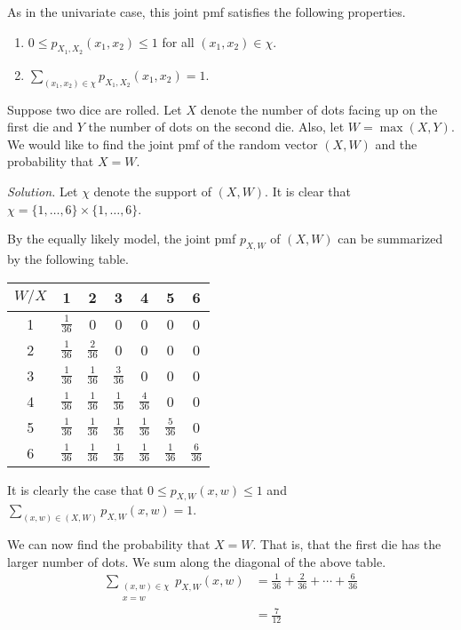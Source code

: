 As in the univariate case, this joint pmf satisfies the following properties.
\begin{enumerate}
	\item $0\leq p_{X_1,X_2}(x_1,x_2)\leq 1$ for all $(x_1,x_2)\in\chi$.
	\item $\sum_{(x_1,x_2)\in\chi}p_{X_1,X_2}(x_1,x_2)=1$.
\end{enumerate}

\begin{example}[]
	Suppose two dice are rolled. Let $X$ denote the number of dots facing up on the first die and $Y$ the number of dots on the second die. Also, let $W=\max(X,Y)$. We would like to find the joint pmf of the random vector $(X,W)$ and the probability that $X=W$.

	\textit{Solution.} Let $\chi$ denote the support of $(X,W)$. It is clear that $\chi=\{1,\hdots,6\}\times\{1,\hdots,6\}$.

	By the equally likely model, the joint pmf $p_{X,W}$ of $(X,W)$ can be summarized by the following table.

	\begin{center}
	\begin{tabular}{c | c c c c c c}
		$W/X$ & 1 & 2 & 3 & 4 & 5 & 6\\\hline
		1 & $\frac{1}{36}$ & 0 & 0 & 0 & 0 & 0\\
		2 & $\frac{1}{36}$ & $\frac{2}{36}$ & 0 & 0 & 0 & 0\\
		3 & $\frac{1}{36}$ & $\frac{1}{36}$ & $\frac{3}{36}$ & 0 & 0 & 0\\
		4 & $\frac{1}{36}$ & $\frac{1}{36}$ & $\frac{1}{36}$ & $\frac{4}{36}$ & 0 & 0\\
		5 & $\frac{1}{36}$ & $\frac{1}{36}$ & $\frac{1}{36}$ & $\frac{1}{36}$ & $\frac{5}{36}$ & 0\\
		6 & $\frac{1}{36}$ & $\frac{1}{36}$ & $\frac{1}{36}$ & $\frac{1}{36}$ & $\frac{1}{36}$ & $\frac{6}{36}$
	\end{tabular}
	\end{center}

	It is clearly the case that $0\leq p_{X,W}(x,w)\leq 1$ and $\sum_{(x,w)\in(X,W)}p_{X,W}(x,w)=1$.

	We can now find the probability that $X=W$. That is, that the first die has the larger number of dots. We sum along the diagonal of the above table.
	\begin{align*}
		\sum_{\substack{(x,w)\in\chi\\x=w}}p_{X,W}(x,w)&=\frac 1{36}+\frac{2}{36}+\cdots+\frac{6}{36}\\
		&=\frac{7}{12}
	\end{align*}

\end{example}

